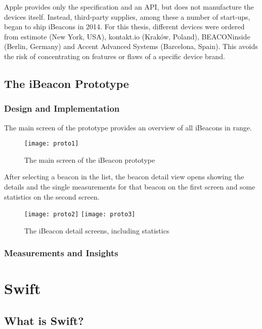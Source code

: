 Apple provides only the specification and an API, but does not manufacture the devices itself. Instead, third-party supplies, among these a number of start-ups, began to ship iBeacons in 2014. For this thesis, different devices were ordered from estimote (New York, USA), kontakt.io (Kraków, Poland), BEACONinside (Berlin, Germany) and Accent Advanced Systems (Barcelona, Spain). This avoids the risk of concentrating on features or flaws of a specific device brand.

\subsection{The iBeacon Prototype}

\subsubsection{Design and Implementation}

The main screen of the prototype provides an overview of all iBeacons in range. %

\begin{figure}[H]
\centering
\texttt{[image: proto1]}
\caption{The main screen of the iBeacon prototype}
\end{figure}

After selecting a beacon in the list, the beacon detail view opens showing the details and the single measurements for that beacon on the first screen and some statistics on the second screen.

\begin{figure}[H]
\centering
\texttt{[image: proto2]}
\texttt{[image: proto3]}
\caption{The iBeacon detail screens, including statistics}
\end{figure}

\subsubsection{Measurements and Insights}



\section{Swift}

\subsection{What is Swift?}

